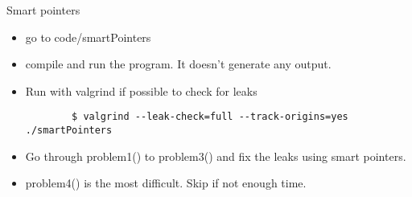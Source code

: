 \begin{frame}[fragile]
  \begin{exercise}{Smart pointers}
    \begin{itemize}
    \item go to code/smartPointers
    \item compile and run the program. It doesn't generate any output.
    \item Run with valgrind if possible to check for leaks
      { \scriptsize
      \begin{verbatim}
        $ valgrind --leak-check=full --track-origins=yes ./smartPointers
      \end{verbatim}
      }
    \item Go through {\ttfamily problem1()} to {\ttfamily problem3()} and fix the leaks using smart pointers.
    \item {\ttfamily problem4()} is the most difficult. Skip if not enough time.
    \end{itemize}
  \end{exercise}
\end{frame}
